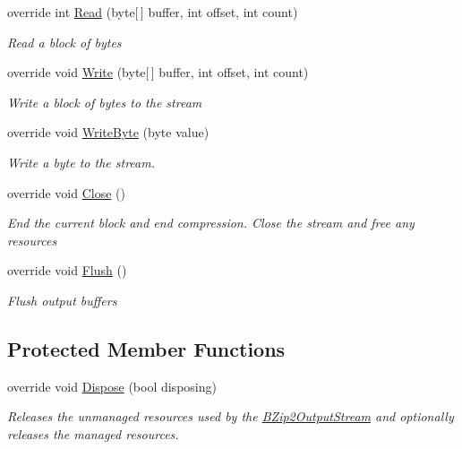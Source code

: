 \begin{DoxyCompactItemize}
override int \hyperlink{class_i_c_sharp_code_1_1_sharp_zip_lib_1_1_b_zip2_1_1_b_zip2_output_stream_af1bc47ecd2791d09e82c7af4a08f9633}{Read} (byte\mbox{[}$\,$\mbox{]} buffer, int offset, int count)
\begin{DoxyCompactList}\small\item\em Read a block of bytes \end{DoxyCompactList}\item 
override void \hyperlink{class_i_c_sharp_code_1_1_sharp_zip_lib_1_1_b_zip2_1_1_b_zip2_output_stream_a7dfa360fea7b90c55bf4e4de4651a34e}{Write} (byte\mbox{[}$\,$\mbox{]} buffer, int offset, int count)
\begin{DoxyCompactList}\small\item\em Write a block of bytes to the stream \end{DoxyCompactList}\item 
override void \hyperlink{class_i_c_sharp_code_1_1_sharp_zip_lib_1_1_b_zip2_1_1_b_zip2_output_stream_a2198dc7663c77d9b38477cf62609dab5}{Write\+Byte} (byte value)
\begin{DoxyCompactList}\small\item\em Write a byte to the stream. \end{DoxyCompactList}\item 
override void \hyperlink{class_i_c_sharp_code_1_1_sharp_zip_lib_1_1_b_zip2_1_1_b_zip2_output_stream_a6d8efc71b181f35fc1529213a8252837}{Close} ()
\begin{DoxyCompactList}\small\item\em End the current block and end compression. Close the stream and free any resources \end{DoxyCompactList}\item 
override void \hyperlink{class_i_c_sharp_code_1_1_sharp_zip_lib_1_1_b_zip2_1_1_b_zip2_output_stream_a36fbb9af5e2d855c75cb200f41b5ae94}{Flush} ()
\begin{DoxyCompactList}\small\item\em Flush output buffers \end{DoxyCompactList}\end{DoxyCompactItemize}
\subsection*{Protected Member Functions}
\begin{DoxyCompactItemize}
\item 
override void \hyperlink{class_i_c_sharp_code_1_1_sharp_zip_lib_1_1_b_zip2_1_1_b_zip2_output_stream_adb8b52993894a6d6341be078940151b0}{Dispose} (bool disposing)
\begin{DoxyCompactList}\small\item\em Releases the unmanaged resources used by the \hyperlink{class_i_c_sharp_code_1_1_sharp_zip_lib_1_1_b_zip2_1_1_b_zip2_output_stream}{B\+Zip2\+Output\+Stream} and optionally releases the managed resources. \end{DoxyCompactList}\end{DoxyCompactItemize}
